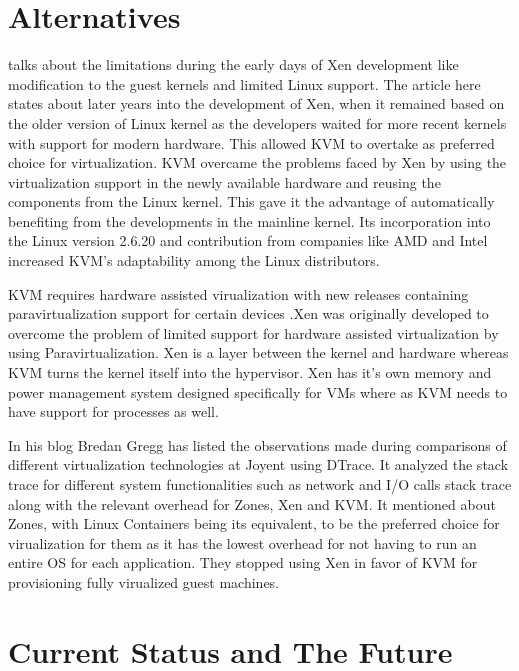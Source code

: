 \documentclass[9pt,twocolumn,twoside]{../../styles/osajnl}
\begin{document}
\section{Alternatives}

\cite{www-kvm-evolution} talks about the limitations during the early days of Xen development like modification to the guest kernels and limited Linux support. The article here \cite{www-kvm-rise} states about later years into the development of Xen, when it remained based on the older version of Linux kernel as the developers waited for more recent kernels with support for modern hardware. This allowed KVM to overtake as preferred choice for virtualization. KVM overcame the problems faced by Xen by using the virtualization support in the newly available hardware and reusing the components from the Linux kernel. This gave it the advantage of automatically benefiting from the developments in the mainline kernel. Its incorporation into the Linux version 2.6.20 and contribution from companies like AMD and Intel increased KVM's adaptability among the Linux distributors.

KVM requires hardware assisted virualization with new releases containing paravirtualization support for certain devices \cite{www-kvm-wiki}.Xen was originally developed to overcome the problem of limited support for hardware assisted virtualization \cite{www-xen-pvh} by using Paravirtualization. Xen is a layer between the kernel and hardware whereas KVM turns the kernel itself into the hypervisor. Xen has it's own memory and power management system designed specifically for VMs where as KVM needs to have support for processes as well.

In his blog \cite{www-tech-comparison} Bredan Gregg has listed the observations made during comparisons of different virtualization technologies at Joyent using DTrace. It analyzed the stack trace for different system functionalities such as network and I/O calls stack trace along with the relevant overhead for Zones, Xen and KVM. It mentioned about Zones, with Linux Containers being its equivalent, to be the preferred choice for virualization for them as it has the lowest overhead for not having to run an entire OS for each application. They stopped using Xen in favor of KVM for provisioning fully virualized guest machines.

\section{Current Status and The Future}
\end{document}
